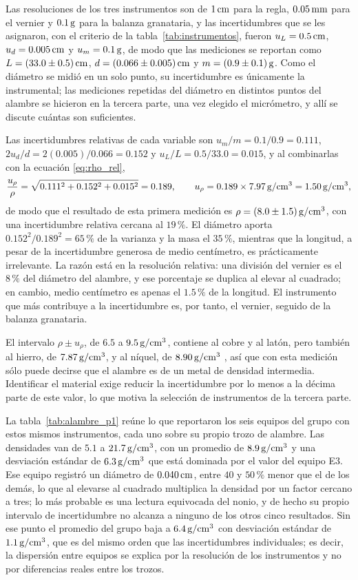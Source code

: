 Las resoluciones de los tres instrumentos son de $1\,\mathrm{cm}$ para la regla, $0.05\,\mathrm{mm}$ para el vernier y $0.1\,\mathrm{g}$ para la balanza granataria, y las incertidumbres que se les asignaron, con el criterio de la tabla~\ref{tab:instrumentos}, fueron $u_L = 0.5\,\mathrm{cm}$, $u_d = 0.005\,\mathrm{cm}$ y $u_m = 0.1\,\mathrm{g}$, de modo que las mediciones se reportan como $L = (33.0 \pm 0.5)\,\mathrm{cm}$, $d = (0.066 \pm 0.005)\,\mathrm{cm}$ y $m = (0.9 \pm 0.1)\,\mathrm{g}$. Como el diámetro se midió en un solo punto, su incertidumbre es únicamente la instrumental; las mediciones repetidas del diámetro en distintos puntos del alambre se hicieron en la tercera parte, una vez elegido el micrómetro, y allí se discute cuántas son suficientes.

Las incertidumbres relativas de cada variable son $u_m/m = 0.1/0.9 = 0.111$, $2u_d/d = 2(0.005)/0.066 = 0.152$ y $u_L/L = 0.5/33.0 = 0.015$, y al combinarlas con la ecuación \eqref{eq:rho_rel},
\begin{equation*}
    \frac{u_\rho}{\rho} = \sqrt{0.111^{2} + 0.152^{2} + 0.015^{2}} = 0.189, \qquad u_\rho = 0.189 \times 7.97\,\mathrm{g/cm^{3}} = 1.50\,\mathrm{g/cm^{3}},
\end{equation*}
de modo que el resultado de esta primera medición es $\rho = (8.0 \pm 1.5)\,\mathrm{g/cm^{3}}$, con una incertidumbre relativa cercana al $19\,\%$. El diámetro aporta $0.152^{2}/0.189^{2} = 65\,\%$ de la varianza y la masa el $35\,\%$, mientras que la longitud, a pesar de la incertidumbre generosa de medio centímetro, es prácticamente irrelevante. La razón está en la resolución relativa: una división del vernier es el $8\,\%$ del diámetro del alambre, y ese porcentaje se duplica al elevar al cuadrado; en cambio, medio centímetro es apenas el $1.5\,\%$ de la longitud. El instrumento que más contribuye a la incertidumbre es, por tanto, el vernier, seguido de la balanza granataria.

El intervalo $\rho \pm u_\rho$, de $6.5$ a $9.5\,\mathrm{g/cm^{3}}$, contiene al cobre y al latón, pero también al hierro, de $7.87\,\mathrm{g/cm^{3}}$, y al níquel, de $8.90\,\mathrm{g/cm^{3}}$ \cite{callister}, así que con esta medición sólo puede decirse que el alambre es de un metal de densidad intermedia. Identificar el material exige reducir la incertidumbre por lo menos a la décima parte de este valor, lo que motiva la selección de instrumentos de la tercera parte.

La tabla~\ref{tab:alambre_p1} reúne lo que reportaron los seis equipos del grupo con estos mismos instrumentos, cada uno sobre su propio trozo de alambre. Las densidades van de $5.1$ a $21.7\,\mathrm{g/cm^{3}}$, con un promedio de $8.9\,\mathrm{g/cm^{3}}$ y una desviación estándar de $6.3\,\mathrm{g/cm^{3}}$ que está dominada por el valor del equipo E3. Ese equipo registró un diámetro de $0.040\,\mathrm{cm}$, entre $40$ y $50\,\%$ menor que el de los demás, lo que al elevarse al cuadrado multiplica la densidad por un factor cercano a tres; lo más probable es una lectura equivocada del nonio, y de hecho su propio intervalo de incertidumbre no alcanza a ninguno de los otros cinco resultados. Sin ese punto el promedio del grupo baja a $6.4\,\mathrm{g/cm^{3}}$ con desviación estándar de $1.1\,\mathrm{g/cm^{3}}$, que es del mismo orden que las incertidumbres individuales; es decir, la dispersión entre equipos se explica por la resolución de los instrumentos y no por diferencias reales entre los trozos.

